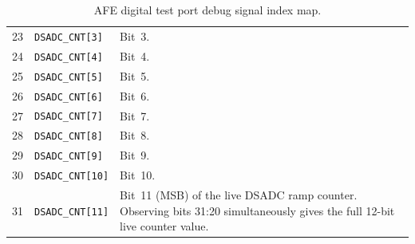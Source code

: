\begin{table}[h]
\begin{tabularx}{\textwidth}{c l X}
23 & \texttt{DSADC\_CNT[3]}  & Bit~3. \\
24 & \texttt{DSADC\_CNT[4]}  & Bit~4. \\
25 & \texttt{DSADC\_CNT[5]}  & Bit~5. \\
26 & \texttt{DSADC\_CNT[6]}  & Bit~6. \\
27 & \texttt{DSADC\_CNT[7]}  & Bit~7. \\
28 & \texttt{DSADC\_CNT[8]}  & Bit~8. \\
29 & \texttt{DSADC\_CNT[9]}  & Bit~9. \\
30 & \texttt{DSADC\_CNT[10]} & Bit~10. \\
31 & \texttt{DSADC\_CNT[11]} & Bit~11 (MSB) of the live DSADC ramp counter. Observing bits 31:20 simultaneously gives the full 12-bit live counter value. \\
\hline
\end{tabularx}
\caption{AFE digital test port debug signal index map.}
\label{t:afe-dtp}
\end{table}
